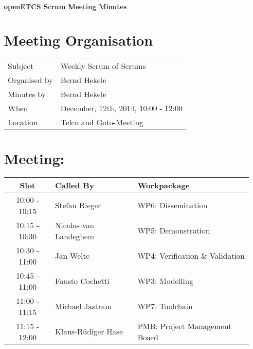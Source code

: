 \documentclass[a4paper, 11pt]{article}
\begin{document}
{\begin{center}\huge\bf openETCS Scrum Meeting Minutes\end{center}}
\section{Meeting Organisation}

\renewcommand{\arraystretch}{1.5}
\begin{supertabular}{m{.2\textwidth}m{.8\textwidth}}
Subject & Weekly Scrum of Scrums\\
Organised by &Bernd Hekele\\
Minutes by & Bernd Hekele\\
When & December, 12th, 2014, 10:00 - 12:00\\
Location & Telco and Goto-Meeting\\
\end{supertabular}

\renewcommand{\arraystretch}{1.0}
\section{Meeting:}

\begin{tabular}{|c|l|l|}
\hline
\textbf{Slot} &  \textbf{Called By} & \textbf{Workpackage} \\
\hline  
10:00 - 10:15 & Stefan Rieger & WP6: Dissemination \\\hline  
10:15 - 10:30 & Nicolas van Landeghem & WP5: Demonstration \\\hline  
10:30 - 11:00 & Jan Welte & WP4: Verification \& Validation \\\hline  
10:45 - 11:00 & Fausto Cochetti & WP3: Modelling \\\hline  
11:00 - 11:15 & Michael Jastram & WP7: Toolchain \\\hline
11:15 - 12:00 & Klaus-R\"udiger Hase & PMB: Project Management Board \\\hline  
\end{tabular}
\end{document}
